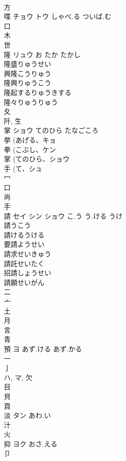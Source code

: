 \documentclass[8pt]{extreport}
\begin{document}
\begin{CJK}{UTF8}{min}
\\	方 
\\	喋	チョウ トウ	しゃべ.る ついば.む	
\\	口 
\\	木 
\\	世 
\\	隆	リュウ	お たか たかし	
\\	隆盛りゅうせい
\\	興隆こうりゅう
\\	隆興りゅうこう
\\	隆起するりゅうきする
\\	隆々りゅうりゅう
\\	夂 
\\	阡, 生 
\\	掌	ショウ	てのひら たなごころ	
\\	挙 (あげる、キョ 
\\	拳 (こぶし、ケン 
\\	掌 (てのひら、ショウ 
\\	手 (て、シュ 
\\	冖 
\\	口 
\\	尚 
\\	手 
\\	請	セイ シン ショウ	こ.う う.ける うけ	
\\	請うこう
\\	請けるうける
\\	要請ようせい
\\	請求せいきゅう
\\	請託せいたく
\\	招請しょうせい
\\	請願せいがん
\\	二 
\\	亠 
\\	土 
\\	月 
\\	言 
\\	青 
\\	預	ヨ	あず.ける あず.かる	
\\	一 
\\	亅 
\\	ハ, マ, 欠 
\\	目 
\\	貝 
\\	頁 
\\	淡	タン	あわ.い	
\\	汁 
\\	火 
\\	抑	ヨク	おさ.える	
\\	卩 

\end{CJK}
\end{document}
